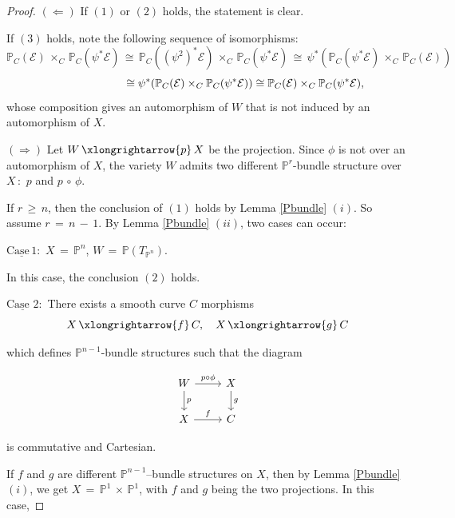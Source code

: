 \documentclass[12pt,reqno]{amsart}
\newcommand{\p}{\mathbb{P}_{C}}
\theoremstyle{definition}
\numberwithin{equation}{section}
\begin{document}
\begin{proof}
$(\Longleftarrow)$ If $(1)$ or $(2)$ holds, the statement is clear. 

If $(3)$ holds, note the following sequence of isomorphisms:
 \begin{equation*}
\p(\mathcal{E})\,\times_{C}\,\p(\psi^{\ast}\mathcal{E})\,\cong\, \p((\psi^{2})^{\ast}\mathcal{E})\,\times_{C}\, \p(\psi^{\ast}\mathcal{E})\,\cong\, \psi^{\ast}(\p(\psi^{\ast}\mathcal{E})\,\times_{C}\,\p(\mathcal{E}))
\end{equation*}
\begin{equation*}
\hspace{2.4cm} \cong\psi^{\ast}(\p(\mathcal{E})\times_{C}\p(\psi^{\ast}\mathcal{E}))\cong \p(\mathcal{E})\times_{C} \p(\psi^{\ast}\mathcal{E}),
\end{equation*}     
whose composition gives an automorphism of $W$ that is not induced by an automorphism of $X$.

$ (\Longrightarrow) $ Let $ W\, \xlongrightarrow{p}\, X$ be the projection. Since $ \phi$ is not over an automorphism of $X$, the variety $W$ admits two different $ \mathbb{P}^r$-bundle structure over $X$\,:\, $p$ and $ p\, \circ\, \phi $.

If $ r\,\geq\, n$, then the conclusion of $(1)$ holds by Lemma \ref{Pbundle} $(i)$. So assume $r\,=\, n\,-\,1$.  By Lemma \ref{Pbundle} $(ii)$, two cases can occur:

     $ \underline{\textrm{Case} \,1}:$  $ X\,=\, \mathbb{P}^n$,  $ W\,=\, \mathbb{P}(T_{\mathbb{P}^n})$. 

     In this case, the conclusion $(2)$ holds.

     $ \underline{\textrm{Case} \,\, 2}:$ There exists a smooth curve $C$ morphisms 
     $$ X\, \xlongrightarrow{f}\, C, \quad X \,\xlongrightarrow{g}\,C$$ 
     
     which defines $ \mathbb{P}^{n-1}$-bundle structures such that the diagram 

\begin{equation}\label{pbundle diagram1}
\begin{tikzcd}
W \arrow[r, "p \circ \phi"] \arrow[d,"p"]
& X \arrow[d, "g" ] \\
X  \arrow[r,"f" ]
& |[, rotate=0]| C
\end{tikzcd}
\end{equation}

is commutative and Cartesian. 

If $f$ and $g$ are different $ \mathbb{P}^{n-1}$--bundle structures on $X$, then by Lemma \ref{Pbundle} $(i)$, we get $ X\, =\, \mathbb{P}^1 \,\times\, \mathbb{P}^1$, with $f$ and $g$ being the two projections. In this case,


\end{proof}
\end{document}
